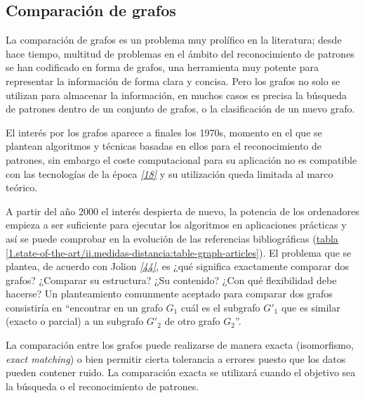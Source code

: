 \documentclass[a4paper,12pt,spanish]{book}
\begin{document}
\subsection{Comparación de grafos}
\label{1.state-of-the-art/ii.medidas-distancia:comparacion-de-grafos}
La comparación de grafos es un problema muy prolífico en la literatura; desde hace tiempo,
multitud de problemas en el ámbito del reconocimiento de patrones se han codificado en forma
de grafos, una herramienta muy potente para representar la información de forma clara y
concisa. Pero los grafos no solo se utilizan para almacenar la información, en muchos casos
es precisa la búsqueda de patrones dentro de un conjunto de grafos, o la clasificación de
un nuevo grafo.

El interés por los grafos aparece a finales los 1970s, momento en el que se plantean
algoritmos y técnicas basadas en ellos para el reconocimiento de patrones, sin embargo el coste
computacional para su aplicación no es compatible con las tecnologías de la
época \label{1.state-of-the-art/ii.medidas-distancia:id1}{\hyperref[zreferences:conte2004]{\emph{{[}18{]}}}} y su utilización queda limitada al marco teórico.

A partir del año 2000 el interés despierta de nuevo, la
potencia de los ordenadores empieza a ser suficiente para ejecutar los algoritmos en
aplicaciones prácticas y así se puede comprobar en la evolución de las referencias
bibliográficas (\hyperref[1.state-of-the-art/ii.medidas-distancia:table-graph-articles]{tabla  \ref*{1.state-of-the-art/ii.medidas-distancia:table-graph-articles}}).
\label{1.state-of-the-art/ii.medidas-distancia:table-graph-articles}
El problema que se plantea, de acuerdo con Jolion \label{1.state-of-the-art/ii.medidas-distancia:id2}{\hyperref[zreferences:jolion2001]{\emph{{[}44{]}}}}, es ¿qué significa
exactamente comparar dos grafos? ¿Comparar su estructura? ¿Su contenido? ¿Con qué
flexibilidad debe hacerse? Un planteamiento comunmente aceptado para comparar dos grafos
consistiría en ``encontrar en un grafo \(G_1\) cuál es el subgrafo \(G'_1\)
que es similar (exacto o parcial) a un subgrafo \(G'_2\) de otro grafo \(G_2\)''.

La comparación entre los grafos puede realizarse de manera exacta (isomorfismo,
\emph{exact matching}) o bien permitir cierta tolerancia a errores puesto que los datos
pueden contener ruido. La comparación exacta se utilizará cuando el objetivo sea
la búsqueda o el reconocimiento de patrones.
\end{document}
